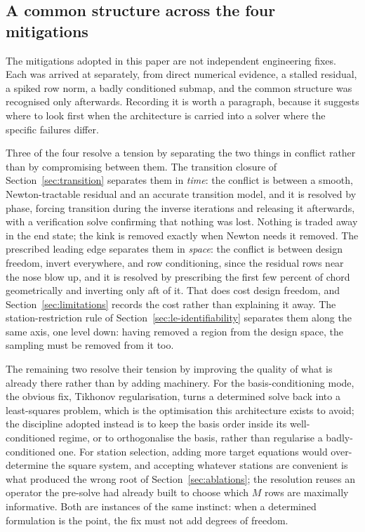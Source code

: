 \subsection{A common structure across the four mitigations}
\label{sec:mitigations}

The mitigations adopted in this paper are not independent engineering fixes.
Each was arrived at separately, from direct numerical evidence, a stalled
residual, a spiked row norm, a badly conditioned submap, and the common
structure was recognised only afterwards. Recording it is worth a paragraph,
because it suggests where to look first when the architecture is carried into
a solver where the specific failures differ.

Three of the four resolve a tension by separating the two things in conflict
rather than by compromising between them. The transition closure of
Section~\ref{sec:transition} separates them in \emph{time}: the conflict is
between a smooth, Newton-tractable residual and an accurate transition model,
and it is resolved by phase, forcing transition during the inverse iterations
and releasing it afterwards, with a verification solve confirming that nothing
was lost. Nothing is traded away in the end state; the kink is removed exactly
when Newton needs it removed. The prescribed leading edge separates them in
\emph{space}: the conflict is between design freedom, invert everywhere, and
row conditioning, since the residual rows near the nose blow up, and it is
resolved by prescribing the first few percent of chord geometrically and
inverting only aft of it. That does cost design freedom, and
Section~\ref{sec:limitations} records the cost rather than explaining it away.
The station-restriction rule of Section~\ref{sec:le-identifiability} separates
them along the same axis, one level down: having removed a region from the
design space, the sampling must be removed from it too.

The remaining two resolve their tension by improving the quality of what is
already there rather than by adding machinery. For the basis-conditioning
mode, the obvious fix, Tikhonov regularisation, turns a determined solve back
into a least-squares problem, which is the optimisation this architecture
exists to avoid; the discipline adopted instead is to keep the basis order
inside its well-conditioned regime, or to orthogonalise the basis, rather than
regularise a badly-conditioned one. For station selection, adding more target
equations would over-determine the square system, and accepting whatever
stations are convenient is what produced the wrong root of
Section~\ref{sec:ablations}; the resolution reuses an operator the pre-solve
had already built to choose which $M$ rows are maximally informative. Both are
instances of the same instinct: when a determined formulation is the point,
the fix must not add degrees of freedom.

